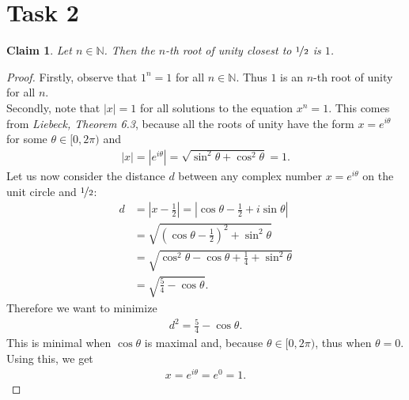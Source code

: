 \documentclass{article}
\newcommand{\N}{\mathbb{N}}
\newtheorem{claim}[section]{Claim}
\begin{document}
\section*{Task 2}
\begin{claim}
Let $n\in\N$. Then the $n$-th root of unity closest to $\nicefrac{1}{2}$ is $1$.
\end{claim}
\begin{proof}
  Firstly, observe that $1^n=1$ for all $n\in\N$. Thus $1$ is an $n$-th root of unity for all $n$.\\
  Secondly, note that $|x|=1$ for all solutions to the equation $x^n=1$. This comes from \emph{Liebeck, Theorem 6.3}, because all the roots of unity have the form $x=e^{i\theta}$ for some $\theta\in[0,2\pi)$ and
  \begin{align*}
    |x|=|e^{i\theta}|=\sqrt{\sin^2\theta+\cos^2\theta}=1.
  \end{align*}
  Let us now consider the distance $d$ between any complex number $x=e^{i\theta}$ on the unit circle and $\nicefrac{1}{2}$:
  \begin{align*}
    d&=\left|x-\frac{1}{2}\right|
    =\left|\cos\theta-\frac{1}{2}+i\sin\theta\right|\\
    &=\sqrt{\left(\cos\theta -\frac{1}{2}\right)^2+\sin^2\theta}\\
    &=\sqrt{\cos^2\theta-\cos\theta+\frac{1}{4}+\sin^2\theta}\\
    &=\sqrt{\frac{5}{4}-\cos\theta}.
  \end{align*}
  Therefore we want to minimize
  \begin{align*}
    d^2=\frac{5}{4}-\cos\theta.
  \end{align*}
  This is minimal when $\cos\theta$ is maximal and, because $\theta\in[0,2\pi)$, thus when $\theta=0$.\\
  Using this, we get
  \begin{align*}
    x=e^{i\theta}=e^{0}=1.
  \end{align*}
\end{proof}
\end{document}
